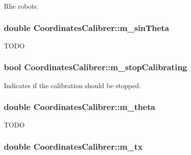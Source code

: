 \label{classCoordinatesCalibrer_aebcdb5e598d2af268ab93a0271c245b6}
Rhe robots. \hypertarget{classCoordinatesCalibrer_af2675b7f9f8612eb53e81a5268501180}{
\subsubsection[{m\_\-sinTheta}]{\setlength{\rightskip}{0pt plus 5cm}double {\bf CoordinatesCalibrer::m\_\-sinTheta}}}
\label{classCoordinatesCalibrer_af2675b7f9f8612eb53e81a5268501180}
TODO \hypertarget{classCoordinatesCalibrer_ac8da80d736936d73e78f21a7f046855d}{
\subsubsection[{m\_\-stopCalibrating}]{\setlength{\rightskip}{0pt plus 5cm}bool {\bf CoordinatesCalibrer::m\_\-stopCalibrating}}}
\label{classCoordinatesCalibrer_ac8da80d736936d73e78f21a7f046855d}
Indicates if the calibration should be stopped. \hypertarget{classCoordinatesCalibrer_a039975d1cf826afcb960e77f8f957f91}{
\subsubsection[{m\_\-theta}]{\setlength{\rightskip}{0pt plus 5cm}double {\bf CoordinatesCalibrer::m\_\-theta}}}
\label{classCoordinatesCalibrer_a039975d1cf826afcb960e77f8f957f91}
TODO \hypertarget{classCoordinatesCalibrer_ad3dcf12acb15253d8467440ccf917581}{
\subsubsection[{m\_\-tx}]{\setlength{\rightskip}{0pt plus 5cm}double {\bf CoordinatesCalibrer::m\_\-tx}}}
